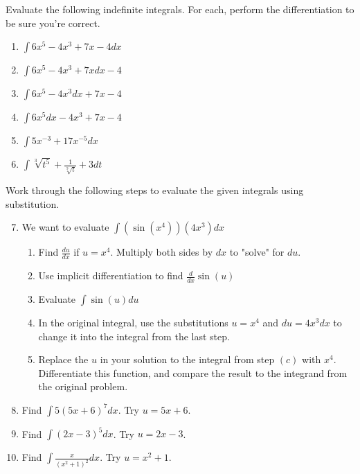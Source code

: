 \documentclass{article}
\begin{document}
Evaluate the following indefinite integrals. For each, perform the differentiation to be sure you're correct.
\begin{enumerate}
\item $\int 6x^5 - 4x^3 + 7x -4 dx$
\item $\int 6x^5 - 4x^3 + 7x dx -4$
\item $\int 6x^5 - 4x^3dx + 7x -4 $
\item $\int 6x^5dx - 4x^3 + 7x -4 $
\item $\int 5x^{-3} + 17x^{-5}dx $
\item $\int \sqrt[3]{t^5} + \frac{1}{\sqrt[9]{t}} + 3 dt$
\end{enumerate}

Work through the following steps to evaluate the given integrals using substitution.
\begin{enumerate}
    \setcounter{enumi}{6}
    \item We want to evaluate $\int (\sin(x^4))(4x^3) dx$
    \begin{enumerate}
        \item Find $\frac{du}{dx}$ if $u = x^4$. Multiply both sides by $dx$ to "solve" for $du$.
        \item Use implicit differentiation to find $\frac{d}{dx} \sin(u)$
        \item Evaluate $\int \sin(u) du$
        \item In the original integral, use the substitutions $u = x^4$ and $du = 4x^3 dx$  to change it into the integral from the last step.
        \item Replace the $u$ in your solution to the integral from step $(c)$ with $x^4$. Differentiate this function, and compare the result to the integrand from the original problem.
    \end{enumerate}
    \item Find $\int 5(5x + 6)^7 dx$. Try $u = 5x+6$.
    \item Find $\int (2x -3)^5 dx$. Try $u = 2x-3$. 
    \item Find $\int \frac{x}{(x^2 + 1)^2} dx$. Try $u = x^2 +1$.
\end{enumerate}
\end{document}
